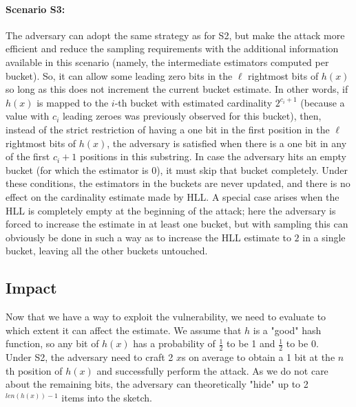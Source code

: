 \documentclass{IEEEtran}
\begin{document}
\paragraph{Scenario S3:} The adversary can adopt the same strategy as for S2, but make the attack more efficient and reduce the sampling requirements with the additional information available in this scenario (namely, the intermediate estimators computed per bucket). So, it can allow some leading zero bits in the $\ell$ rightmost bits of $h(x)$ so long as this does not increment the current bucket estimate. In other words, if $h(x)$ is mapped to the $i$-th bucket with estimated cardinality $2^{c_i + 1}$ (because a value with $c_i$ leading zeroes was previously observed for this bucket), then, instead of the strict restriction of having a one bit in the first position in the $\ell$ rightmost bits of $h(x)$, the adversary is satisfied when there is a one bit in any of the first $c_i+1$ positions in this substring. In case the adversary hits an empty bucket (for which the estimator is 0), it must skip that bucket completely. Under these conditions, the estimators in the buckets are never updated, and there is no effect on the cardinality estimate made by HLL.  A special case arises when the HLL is completely empty at the beginning of the attack; here the adversary is forced to increase the estimate in at least one bucket, but with sampling this can obviously be done in such a way as to increase the HLL estimate to $2$ in a single bucket, leaving all the other buckets untouched.

\subsection{Impact}
Now that we have a way to exploit the vulnerability, we need to evaluate to which extent it can affect the estimate. We assume that $h$ is a "good" hash function, so any bit of $h(x)$ has a probability of $\frac{1}{2}$ to be 1 and $\frac{1}{2}$ to be 0.\\

Under S2, the adversary need to craft 2 $x$s on average to obtain a 1 bit at the $n$th position of $h(x)$ and successfully perform the attack. As we do not care about the remaining bits, the adversary can theoretically "hide" up to 2$^{len(h(x))-1}$ items into the sketch.\\
\end{document}
